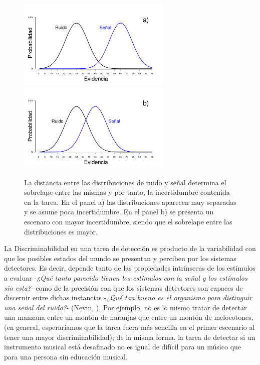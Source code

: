 \begin{figure}[h]
\centering
\includegraphics[width=0.65\textwidth]{Figures/Overlap_Small}\\ 
\includegraphics[width=0.65\textwidth]{Figures/Overlap_Big} 
\caption[La detección como una tarea con incertidumbre: el sobrelape entre las distribuciones]{La distancia entre las distribuciones de ruido y señal determina el sobrelape entre las mismas y por tanto, la incertidumbre contenida en la tarea. En el panel a) las distribuciones aparecen muy separadas y se asume poca incertidumbre.  En el panel b) se presenta un escenaro con mayor incertidumbre, siendo que el sobrelape entre las distribuciones es mayor.}
\label{fig:Overlap}
\end{figure}

La Discriminabilidad en una tarea de detección es producto de la variabilidad con que los posibles estados del mundo se presentan y perciben por los sistemas detectores. Es decir, depende tanto de las propiedades intrínsecas de los estímulos a evaluar -\textit{¿Qué tanto parecido tienen los estímulos con la señal y los estímulos sin esta?}- como de la precisión con que los sistemas detectores son capaces de discernir entre dichas instancias -\textit{¿Qué tan bueno es el organismo para distinguir una señal del ruido?}- (Nevin, \citeyear{Nevin1969}). Por ejemplo, no es lo mismo tratar de detectar una manzana entre un montón de naranjas que entre un montón de melocotones, (en general, esperaríamos que la tarea fuera más sencilla en el primer escenario al tener una mayor discriminabilidad); de la misma forma, la tarea de detectar si un instrumento musical está desafinado no es igual de difícil para un músico que para una persona sin educación musical.\\

